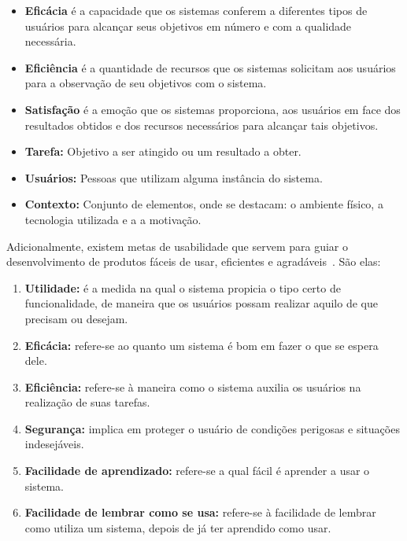 \begin{itemize}
\item \textbf{Eficácia} é a capacidade que os sistemas conferem a diferentes tipos de usuários para alcançar seus objetivos em número e com a qualidade necessária. 

\item \textbf{Eficiência} é a quantidade de recursos que os sistemas solicitam aos usuários para a observação de seu objetivos com o sistema.

\item \textbf{Satisfação} é a emoção que os sistemas proporciona, aos usuários em face dos resultados obtidos e dos recursos necessários para alcançar tais objetivos. 

\item \textbf{Tarefa:} Objetivo a ser atingido ou um resultado a obter.

\item \textbf{Usuários:} Pessoas que utilizam alguma instância do sistema.

\item \textbf{Contexto:} Conjunto de elementos, onde se destacam: o ambiente físico, a tecnologia utilizada e a a motivação.
\end{itemize}

Adicionalmente, existem metas de usabilidade que servem para guiar o desenvolvimento de produtos fáceis de usar, eficientes e agradáveis~\cite{preece2007}. São elas:

\begin{enumerate}
	\item \textbf{Utilidade:} é a medida na qual o sistema propicia o tipo certo de funcionalidade, de maneira que os usuários possam realizar aquilo de que precisam ou desejam.
	\item \textbf{Eficácia:} refere-se ao quanto um sistema é bom em fazer o que se espera dele.
	\item \textbf{Eficiência:} refere-se à maneira como o sistema auxilia os usuários na realização de suas tarefas.
	\item \textbf{Segurança:} implica em proteger o usuário de condições perigosas e situações indesejáveis.
	\item \textbf{Facilidade de aprendizado:} refere-se a qual fácil é aprender a usar o sistema.
	\item \textbf{Facilidade de lembrar como se usa:} refere-se à facilidade de lembrar como utiliza um sistema, depois de já ter aprendido como usar.
\end{enumerate}

